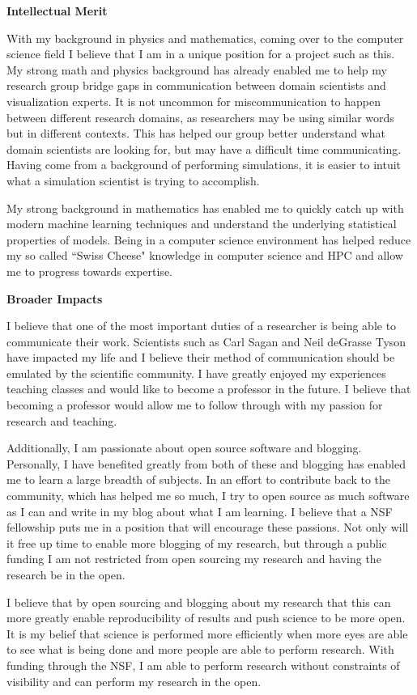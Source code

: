 \documentclass[12pt]{article}
\begin{document}
\textbf{Intellectual Merit}
%

With my background in physics and mathematics, coming over to the computer
science field I believe that I am in a unique position for a project such as
this. My strong math and physics background has already enabled me to help my
research group bridge gaps in communication between domain scientists and
visualization experts. It is not uncommon for miscommunication to happen between
different research domains, as researchers may be using similar words but in
different contexts. This has helped our group better understand what domain
scientists are looking for, but may have a difficult time communicating. Having
come from a background of performing simulations, it is easier to intuit what a
simulation scientist is trying to accomplish.

My strong background in mathematics has enabled me to quickly catch up with
modern machine learning techniques and understand the underlying statistical
properties of models. Being in a computer science environment has helped reduce
my so called ``Swiss Cheese" knowledge in computer science and HPC and allow me 
to progress towards expertise. 

\textbf{Broader Impacts}
%

I believe that one of the most important duties of a researcher is being able to
communicate their work. Scientists such as Carl Sagan and Neil deGrasse Tyson
have impacted my life and I believe their method of communication should be
emulated by the scientific community. I have greatly enjoyed my experiences
teaching classes and would like to become a professor in the future. I believe
that becoming a professor would allow me to follow through with my passion for
research and teaching. 

Additionally, I am passionate about open source software and blogging.
Personally, I have benefited greatly from both of these and blogging has enabled
me to learn a large breadth of subjects. In an effort to contribute back to the
community, which has helped me so much, I try to open source as much software as
I can and write in my blog about what I am learning. I believe that a NSF
fellowship puts me in a position that will encourage these passions. Not only
will it free up time to enable more blogging of my research, but through a
public funding I am not restricted from open sourcing my research and having the
research be in the open.

I believe that by open sourcing and blogging about my research that this can
more greatly enable reproducibility of results and push science to be more open.
It is my belief that science is performed more efficiently when more eyes are
able to see what is being done and more people are able to perform research.
With funding through the NSF, I am able to perform research without constraints
of visibility and can perform my research in the open.
\end{document}
